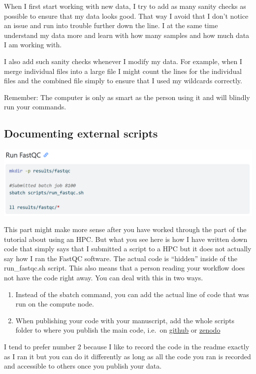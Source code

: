 \documentclass[
  letterpaper,
  DIV=11,
  numbers=noendperiod]{scrreprt}
\providecommand{\tightlist}{%
  \setlength{\itemsep}{0pt}\setlength{\parskip}{0pt}}\usepackage{longtable,booktabs,array}
\begin{document}
When I first start working with new data, I try to add as many sanity
checks as possible to ensure that my data looks good. That way I avoid
that I don't notice an issue and run into trouble further down the line.
I at the same time understand my data more and learn with how many
samples and how much data I am working with.

I also add such sanity checks whenever I modify my data. For example,
when I merge individual files into a large file I might count the lines
for the individual files and the combined file simply to ensure that I
used my wildcards correctly.

Remember: The computer is only as smart as the person using it and will
blindly run your commands.

\subsection{Documenting external
scripts}\label{documenting-external-scripts}

\includegraphics[width=5.82292in,height=\textheight]{../img/external_scripts.png}

This part might make more sense after you have worked through the part
of the tutorial about using an HPC. But what you see here is how I have
written down code that simply says that I submitted a script to a HPC
but it does not actually say how I ran the FastQC software. The actual
code is ``hidden'' inside of the run\_fastqc.sh script. This also means
that a person reading your workflow does not have the code right away.
You can deal with this in two ways.

\begin{enumerate}
\def\labelenumi{\arabic{enumi}.}
\tightlist
\item
  Instead of the sbatch command, you can add the actual line of code
  that was run on the compute node.
\item
  When publishing your code with your manuscript, add the whole scripts
  folder to where you publish the main code, i.e.~on
  \href{https://github.com/ndombrowski/cli_workshop/tree/main/example_doc}{github}
  or \href{https://zenodo.org/records/3839790}{zenodo}
\end{enumerate}

I tend to prefer number 2 because I like to record the code in the
readme exactly as I ran it but you can do it differently as long as all
the code you ran is recorded and accessible to others once you publish
your data.
\end{document}
